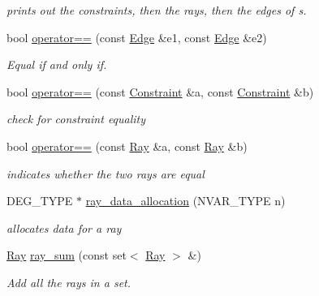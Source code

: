 \begin{DoxyCompactItemize}
\begin{DoxyCompactList}\small\item\em prints out the constraints, then the rays, then the edges of {\ttfamily s}. \end{DoxyCompactList}\item 
bool \hyperlink{namespace_l_p___solvers_a4f4058fe5f5231e90bf5f864c8cc06f2}{operator==} (const \hyperlink{group___c_l_s_solvers_class_l_p___solvers_1_1_edge}{Edge} \&e1, const \hyperlink{group___c_l_s_solvers_class_l_p___solvers_1_1_edge}{Edge} \&e2)
\begin{DoxyCompactList}\small\item\em Equal if and only if. \end{DoxyCompactList}\item 
bool \hyperlink{namespace_l_p___solvers_ac547de44c030843952f4dd715accaf1d}{operator==} (const \hyperlink{group___c_l_s_solvers_class_l_p___solvers_1_1_constraint}{Constraint} \&a, const \hyperlink{group___c_l_s_solvers_class_l_p___solvers_1_1_constraint}{Constraint} \&b)
\begin{DoxyCompactList}\small\item\em check for constraint equality \end{DoxyCompactList}\item 
bool \hyperlink{namespace_l_p___solvers_abda74dc37387f370329de0f20b63f124}{operator==} (const \hyperlink{group___c_l_s_solvers_class_l_p___solvers_1_1_ray}{Ray} \&a, const \hyperlink{group___c_l_s_solvers_class_l_p___solvers_1_1_ray}{Ray} \&b)
\begin{DoxyCompactList}\small\item\em indicates whether the two rays are equal \end{DoxyCompactList}\item 
D\+E\+G\+\_\+\+T\+Y\+PE $\ast$ \hyperlink{namespace_l_p___solvers_a7e1accee51d4f9339ef83bf93d653544}{ray\+\_\+data\+\_\+allocation} (N\+V\+A\+R\+\_\+\+T\+Y\+PE n)
\begin{DoxyCompactList}\small\item\em allocates data for a ray \end{DoxyCompactList}\item 
\hyperlink{group___c_l_s_solvers_class_l_p___solvers_1_1_ray}{Ray} \hyperlink{group___c_l_s_solvers_ga42f6aa14b6c3adb4df26f8338d486401}{ray\+\_\+sum} (const set$<$ \hyperlink{group___c_l_s_solvers_class_l_p___solvers_1_1_ray}{Ray} $>$ \&)
\begin{DoxyCompactList}\small\item\em Add all the rays in a set. \end{DoxyCompactList}\item 

\end{DoxyCompactItemize}
